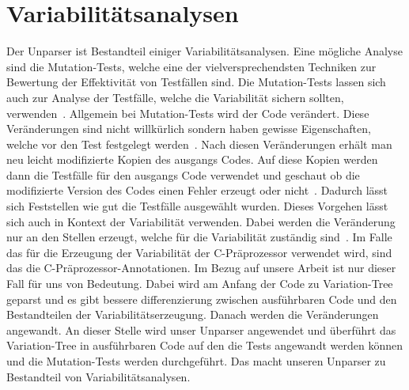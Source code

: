 \section{Variabilitätsanalysen}
Der Unparser ist Bestandteil einiger Variabilitätsanalysen. Eine mögliche Analyse sind die Mutation-Tests, welche eine der vielversprechendsten Techniken zur Bewertung der Effektivität von Testfällen sind. Die Mutation-Tests lassen sich auch zur Analyse der Testfälle, welche die Variabilität sichern sollten, verwenden~\cite{ABT+:VaMoS16,LS:SPLat14}. Allgemein bei Mutation-Tests wird der Code verändert. Diese Veränderungen sind nicht willkürlich sondern haben gewisse Eigenschaften, welche vor den Test festgelegt werden~\cite{ABT+:VaMoS16,LS:SPLat14}. Nach diesen Veränderungen erhält man neu leicht modifizierte Kopien des ausgangs Codes. Auf diese Kopien werden dann die Testfälle für den ausgangs Code verwendet und geschaut ob die modifizierte Version des Codes einen Fehler erzeugt oder nicht~\cite{ABT+:VaMoS16,LS:SPLat14}. Dadurch lässt sich Feststellen wie gut die Testfälle ausgewählt wurden. Dieses Vorgehen lässt sich auch in Kontext der Variabilität verwenden. Dabei werden die Veränderung nur an den Stellen erzeugt, welche für die Variabilität zuständig sind~\cite{ABT+:VaMoS16,LS:SPLat14}. Im Falle das für die Erzeugung der Variabilität der C-Präprozessor verwendet wird, sind das die C-Präprozessor-Annotationen. Im Bezug auf unsere Arbeit ist nur dieser Fall für uns von Bedeutung. Dabei wird am Anfang der Code zu Variation-Tree geparst und es gibt bessere differenzierung zwischen ausführbaren Code und den Bestandteilen der Variabilitätserzeugung. Danach werden die Veränderungen angewandt. An dieser Stelle wird unser Unparser angewendet und überführt das Variation-Tree in ausführbaren Code auf den die Tests angewandt werden können und die Mutation-Tests werden durchgeführt. Das macht unseren Unparser zu Bestandteil von Variabilitätsanalysen.









